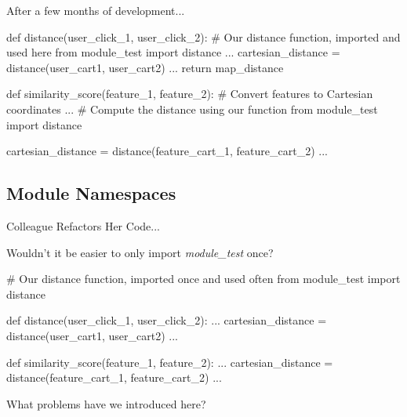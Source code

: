 \documentclass[11pt,table]{beamer}
\begin{document}

\begin{frame}[fragile]{After a few months of development...}

\begin{mintypython}
def distance(user_click_1, user_click_2):
    # Our distance function, imported and used here
    from module_test import distance
    ...
    cartesian_distance = distance(user_cart1, user_cart2)
    ...
    return map_distance

def similarity_score(feature_1, feature_2):
    # Convert features to Cartesian coordinates
    ...
    # Compute the distance using our function
    from module_test import distance

    cartesian_distance = distance(feature_cart_1, feature_cart_2)
    ...
\end{mintypython}

\end{frame}

\subsection{Module Namespaces}
\begin{frame}[fragile]{Colleague Refactors Her Code...}

Wouldn't it be easier to only import {\em module\_test} once?

\begin{mintypython}
# Our distance function, imported once and used often
from module_test import distance

def distance(user_click_1, user_click_2):
    ...
    cartesian_distance = distance(user_cart1, user_cart2)
    ...

def similarity_score(feature_1, feature_2):
    ...
    cartesian_distance = distance(feature_cart_1, feature_cart_2)
    ...
\end{mintypython}

What problems have we introduced here?

\end{frame}
\end{document}
